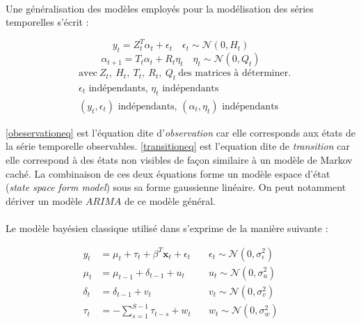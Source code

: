 \documentclass{article}
\theoremstyle{definition}
\theoremstyle{remark}
\begin{document}
{\paragraph{}
Une généralisation des modèles employés pour la modélisation des séries temporelles s'écrit :

\begin{equation}
	\label{obeservationeq}
	y_{t}=Z_{t}^{T} \alpha_{t}+\epsilon_{t} \quad \epsilon_{t} \sim \mathcal{N}\left(0, H_{t}\right)
\end{equation}
\begin{equation}
	\label{transitioneq}
	\alpha_{t+1}=T_{t} \alpha_{t}+R_{t} \eta_{t} \quad \eta_{t} \sim \mathcal{N}\left(0, Q_{t}\right)
\end{equation}
\vspace{0.1cm}
\[
	\begin{aligned}
		& \text{avec} \ Z_t, \ H_t , \ T_t, \ R_t, \ Q_t \ \text{des matrices à déterminer}. \\
		& \epsilon_t\text{ indépendants, }\eta_t\text{ indépendants} \\
		& (y_t,\epsilon_t)\text{ indépendants,  }(\alpha_t,\eta_t)\text{ indépendants}
	\end{aligned}
\]
	
\ref{obeservationeq} est l'équation dite d'\textit{observation} car elle corresponds aux états de la série temporelle observables. 
\ref{transitioneq} est l'equation dite de \textit{transition} car elle correspond à des états non visibles de façon similaire à un modèle de Markov caché. 
La combinaison de ces deux équations forme un modèle espace d'état (\textit{state space form model}) sous sa forme gaussienne linéaire. On peut notamment dériver un modèle $ARIMA$ de ce modèle général.

\paragraph{}

Le modèle bayésien classique utilisé dans \cite{pedictbayesian} s'exprime de la manière suivante :

\begin{equation}
	\label{modelebayes}
	\begin{aligned} 
		y_{t} &=\mu_{t}+\tau_{t}+\beta^{T} \mathbf{x}_{t}+\epsilon_{t} \quad & \epsilon_{t} 
		\sim \mathcal{N}(0, \sigma_{\epsilon}^2) \\ 
		\mu_{t} &=\mu_{t-1}+\delta_{t-1}+u_{t} \quad & u_{t} \sim \mathcal{N}(0, \sigma_{u}^2) \\
		\delta_{t} &=\delta_{t-1}+v_{t} \quad & v_{t} \sim \mathcal{N}(0, \sigma_{v}^2) \\
		\tau_{t} &=-\sum_{s=1}^{S-1} \tau_{t-s}+w_{t} \quad & w_{t} \sim \mathcal{N}(0, \sigma_{w}^2)
	\end{aligned}
\end{equation}

}
\end{document}
